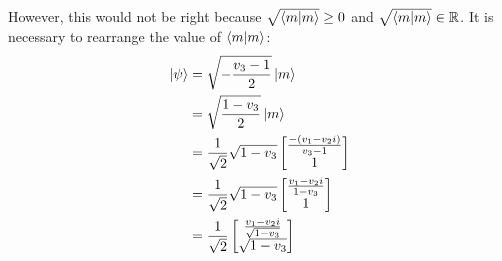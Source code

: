 However, this would not be right because
$\sqrt{\mathop{\mathinner{ \langle{m}|{m}\rangle}}} \geq 0$ and
$\sqrt{\mathop{\mathinner{ \langle{m}|{m}\rangle}}} \in \mathbb{R}$.
It is necessary to rearrange the value of $\mathop{\mathinner{ \langle{m}|{m}\rangle}}$:
\begin{align}
    \ket{\psi} &= \sqrt{- \frac{v_3 - 1}{2}} \ket{m} \\
    &= \sqrt{\frac{1 - v_3}{2}} \ket{m} \\
    &= \frac{1}{\sqrt2} \sqrt{1 - v_3}
        \left[ \begin{matrix}
            \frac{-(v_1 - v_2i)}{v_3 - 1} \\ 1
        \end{matrix} \right] \\
    &= \frac{1}{\sqrt2} \sqrt{1 - v_3}
        \left[ \begin{matrix}
            \frac{v_1 - v_2i}{1 - v_3} \\ 1
        \end{matrix} \right] \\
    &= \frac{1}{\sqrt2} \left[ \begin{matrix}
            \frac{v_1 - v_2i}{\sqrt{1 - v_3}} \\
            \sqrt{1 - v_3}
        \end{matrix} \right]
\end{align}

